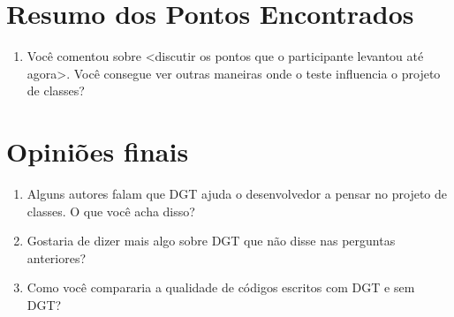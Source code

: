 \section{Resumo dos Pontos Encontrados}

\begin{enumerate}
	\item Você comentou sobre <discutir os pontos que o participante levantou até agora>. Você
	consegue ver outras maneiras onde o teste influencia o projeto de classes?
\end{enumerate}

\section{Opiniões finais}

\begin{enumerate}
	\item Alguns autores falam que DGT ajuda o desenvolvedor a pensar no projeto de classes. O que você acha disso?

	\item Gostaria de dizer mais algo sobre DGT que não disse nas perguntas anteriores?
	
	\item Como você compararia a qualidade de códigos escritos com DGT e sem DGT? 

\end{enumerate}
